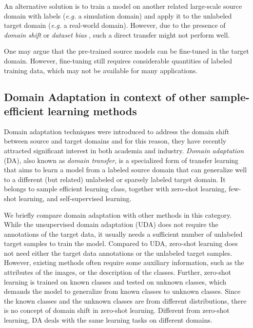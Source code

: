 \documentclass[conference]{IEEEtran}
\begin{document}
 An alternative solution is to train a model on another related large-scale
 source domain with labels (\textit{e.g.} a simulation domain) and apply
 it to the unlabeled target domain (\textit{e.g.} a real-world domain).
 However, due to the presence of \textit{domain shift} or \textit{dataset bias} \cite{b1},
 such a direct transfer might not perform well. 

 One may argue that the pre-trained source models can be fine-tuned in the target domain.
 However, fine-tuning still requires considerable quantities of labeled training data,
 which may not be available for many applications. 

 \subsection{Domain Adaptation in context of other sample-efficient learning methods}
 Domain adaptation techniques were introduced to address the domain shift 
 between source and target domains and for this reason, they have recently
 attracted significant interest in both academia and industry.
 \textit{Domain adaptation} (DA), also known as \textit{domain transfer},
 is a specialized form of transfer learning that aims to learn a model 
 from a labeled source domain that can generalize well to a different 
 (but related) unlabeled or sparsely labeled target domain. It belongs
 to sample efficient learning class, together with zero-shot learning,
 few-shot learning, and self-supervised learning.

 We briefly compare domain adaptation with other methods in this category.
While the unsupervised domain adaptation (UDA) does not require the annotations of
the target data, it usually needs a sufficient number of unlabeled target samples
to train the model.
Compared to UDA, zero-shot learning does not need either the target data annotations 
or the unlabeled target samples. 
However, existing methods often require some auxiliary information, such as the attributes 
of the images, or the description of the classes.
Further, zero-shot learning is trained on known classes and tested on unknown classes, 
which demands the model to generalize from known classes to unknown classes. 
Since the known classes and the unknown classes are from different distributions, 
there is no concept of domain shift in zero-shot learning. 
Different from zero-shot learning, DA deals with the same learning tasks on different
domains. 
\end{document}
